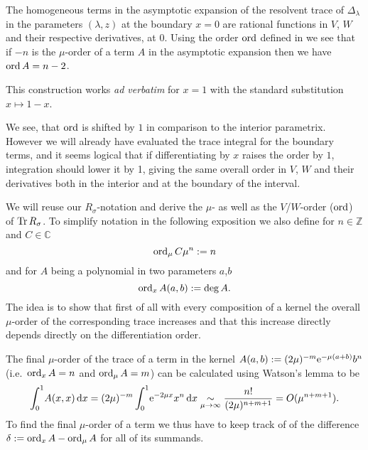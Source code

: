 \begin{MainTheorem}
  The homogeneous terms in the asymptotic expansion of the resolvent trace of
  $\Delta_\lambda$ in the parameters $(\lambda,z)$ at the boundary $x = 0$ are
  rational functions in $V$, $W$ and their respective derivatives, at $0$. Using
  the order $\ord$ defined in  we see that if $-n$ is the
  $\mu$-order of a term $A$ in the asymptotic expansion then we have $\ord A = n
  - 2$.
  \begin{Remark}
    This construction works \emph{ad verbatim} for $x = 1$ with the standard
    substitution $x\mapsto 1 - x$.
  \end{Remark}
  \begin{Remark}
    We see, that $\ord$ is shifted by $1$ in comparison to the interior
    parametrix. However we will already have evaluated the trace integral for
    the boundary terms, and it seems logical that if differentiating by $x$
    raises the order by $1$, integration should lower it by 1, giving the same
    overall order in $V$, $W$ and their derivatives both in the interior and at
    the boundary of the interval.
  \end{Remark}
  \begin{Proof}
    We will reuse our $R_\sigma$-notation and derive the $\mu$- as well as the
    $V$/$W$-order ($\ord$) of $\Tr R_\sigma$. To simplify notation in the
    following exposition we also define for $n\in\mathbb{Z}$ and
    $C\in\mathbb{C}$
    \begin{equation}
      \ord_\mu C\mu^n := n
    \end{equation}
    and for $A$ being a polynomial in two parameters $a$,$b$
    \begin{equation}
      \ord_x A(a,b) := \deg A.
    \end{equation}
    The idea is to show that first of all with every composition of a kernel
    the overall $\mu$-order of the corresponding trace increases and that this
    increase directly depends directly on the differentiation order.

    The final $\mu$-order of the trace of a term in the kernel $A(a,b) :=
    (2\mu)^{-m}\Eto{-\mu(a+b)}b^n$ (i.e.\ $\ord_x A = n$ and $\ord_\mu A = m$)
    can be calculated using Watson's lemma to be
    \begin{equation}
      \Int{x}{A(x,x)} = (2\mu)^{-m}\Int{x}{\Eto{-2\mu x}x^n} \SimMu
      \frac{n!}{(2\mu)^{n+m+1}} = O(\mu^{n+m+1}).
    \end{equation}
    To find the final $\mu$-order of a term we thus have to keep track of of the
    difference $\delta := \ord_x A - \ord_\mu A$ for all of its summands.


\end{Proof}
\end{MainTheorem}
